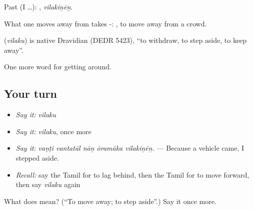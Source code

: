 Past (I …): , \emph{vilakiṉēṉ}.

What one moves away from takes -:  , to move away from a crowd.

\begin{cousinweb}
\textbf{} (\emph{vilaku}) is native Dravidian (DEDR 5423), \textquotedblleft{}to withdraw, to step aside, to keep away\textquotedblright{}.
\end{cousinweb}

\begin{grammarlens}[title={What you've built}]
One more word for getting around.
\end{grammarlens}

\subsection*{Your turn}
\begin{itemize}
\raggedright
  \item \emph{Say it:} \emph{vilaku}
  \item \emph{Say it:} \emph{vilaku}, once more
  \item \emph{Say it:} \emph{vaṇṭi vantatāl nāṉ ōramāka vilakiṉēṉ.} — Because a vehicle came, I stepped aside.
  \item \emph{Recall:} say the Tamil for to lag behind, then the Tamil for to move forward, then say \emph{vilaku} again
\end{itemize}

\begin{tcolorbox}[breakable,colback=teal!4,colframe=teal!35!black,title={Before you move on}]
What does  mean? (\textquotedblleft{}To move away; to step aside\textquotedblright{}.) Say it once more.
\end{tcolorbox}
